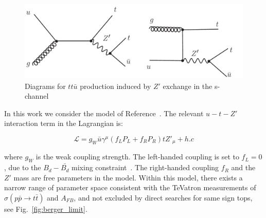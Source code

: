 \begin{figure}[htb]
\begin{center}
\includegraphics[width=0.7\linewidth, height=0.25\linewidth]{figs/sstop2.pdf}
\caption{ Diagrams for $tt\bar{u}$ production induced by $Z'$ exchange in the s-channel 
\label{fig:schannel}}
\end{center}
\end{figure}



In this work we consider the model of Reference~\cite{berger}.  
The relevant $u-t-Z'$ interaction term in the Lagrangian is:

\begin{equation}
  \mathcal{L} = g_W \bar{u} \gamma^\mu (f_L P_L + f_R P_R)tZ'_\mu + h.c
\end{equation}

where $g_W$ is the weak coupling strength. The left-handed coupling is set to $f_L = 0$, due 
to the $B_d-\bar{B_d}$ mixing constraint~\cite{Cao}. 
The right-handed coupling $f_R$ and the $Z'$ mass are free parameters in the model.
Within this model, there exists a narrow range of parameter space
consistent with the TeVatron measurements of $\sigma(p\bar{p} \to t\bar{t})$ 
and $A_{FB}$,
and not excluded by direct searches for same sign tops, see
Fig.~\ref{fig:berger_limit}.

 


